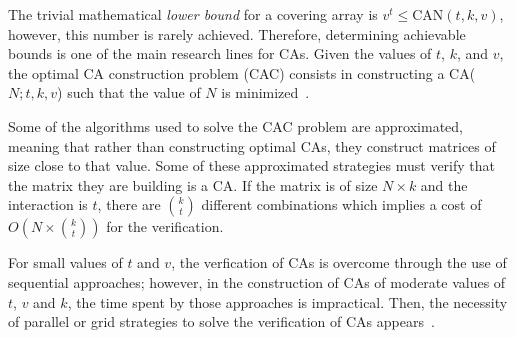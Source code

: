 The trivial mathematical \textit{lower bound} for a covering array is $v^{t} \leq \text{CAN}(t, k ,v)$, however, this number is rarely achieved. Therefore, determining achievable bounds is one of the main research lines for CAs. Given the values of $t$, $k$, and $v$, the optimal CA construction problem (CAC) consists in constructing a CA($N; t, k, v$) such that the value of $N$ is minimized~\cite{Torres-Jimenez:2012}.

Some of the algorithms used to solve the CAC problem are approximated, meaning that rather than constructing optimal CAs, they construct matrices of size close to that value. Some of these approximated strategies must verify that the matrix they are building is a CA. If the matrix is of size $N \times k$ and the interaction is $t$, there are $\binom{k}{t}$ different combinations which implies a cost of $O(N \times \binom{k}{t})$ for the verification.

For small values of $t$ and $v$, the verfication of CAs is overcome through the use of sequential approaches; however, in the construction of CAs of moderate values of $t$, $v$ and $k$, the time spent by those approaches is impractical. Then, the necessity of parallel or grid strategies to solve the verification of CAs appears~\cite{Avila-George:2012}.
